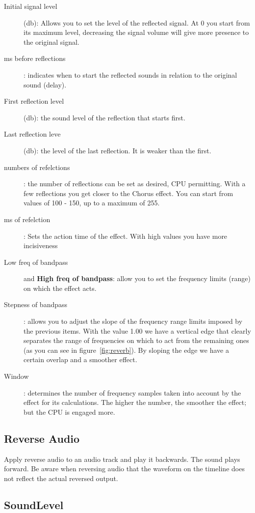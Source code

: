 \begin{description}
	\item[Initial signal level](db): Allows you to set the level of the reflected signal. At 0 you start from its maximum level, decreasing the signal volume will give more presence to the original signal.
	\item[ms before reflections]: indicates when to start the reflected sounds in relation to the original sound  (delay).
	\item[First reflection level] (db): the sound level of the reflection that starts first.
	\item[Last reflection leve] (db): the level of the last reflection. It is weaker than the first.
	\item[numbers of refelctions]: the number of reflections can be set as desired, CPU permitting. With a few reflections you get closer to the Chorus effect. You can start from values of 100 - 150, up to a maximum of 255.
	\item[ms of refelction]: Sets the action time of the effect. With high values you have more incisiveness
	\item[Low freq of bandpass] and \textbf{High freq of bandpass}: allow you to set the frequency limits (range) on which the effect acts.
	\item[Stepness of bandpass]: allows you to adjust the slope of the frequency range limits imposed by the previous items. With the value 1.00 we have a vertical edge that clearly separates the range of frequencies on which to act from the remaining ones (as you can see in figure~\ref{fig:reverb}). By sloping the edge we have a certain overlap and a smoother effect.
	\item[Window]: determines the number of frequency samples taken into account by the effect for its calculations. The higher the number, the smoother the effect; but the CPU is engaged more.
\end{description}

\subsection{Reverse Audio}%
\label{sub:reverse_audio}

Apply reverse audio to an audio track and play it backwards. The sound plays forward. Be aware when reversing audio that the waveform on the timeline does not reflect the actual reversed output.

\subsection{SoundLevel}%
\label{sub:soundlevel}

